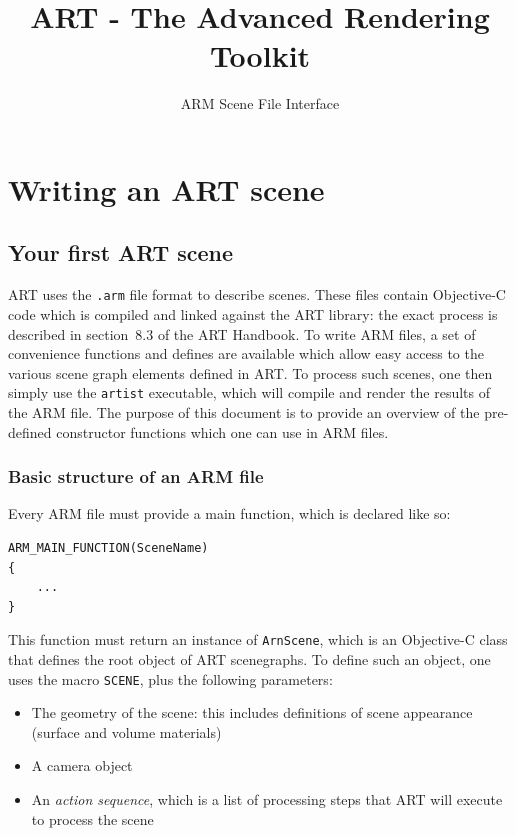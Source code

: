 \documentclass[a4paper,chapterprefix]{scrbook}
\title{
  \Huge ART - The Advanced Rendering Toolkit
}
\subtitle{ARM Scene File Interface}
\date{}
\begin{document}
\maketitle
\tableofcontents

\part{Writing an ART scene}

\chapter{Your first ART scene}

ART uses the \verb?.arm? file format to describe scenes. These files contain Objective-C code which is compiled and linked against the ART library: the exact process is described in section~8.3 of the ART Handbook. To write ARM files, a set of convenience functions and defines are available which allow easy access to the various scene graph elements defined in ART. To process such scenes, one then simply use the \verb?artist? executable, which will compile and render the results of the ARM file. The purpose of this document is to provide an overview of the pre-defined constructor functions which one can use in ARM files.

\section{Basic structure of an ARM file}
Every ARM file must provide a main function, which is declared like so:
\begin{lstlisting}
ARM_MAIN_FUNCTION(SceneName)
{
    ...
}
\end{lstlisting}

This function must return an instance of \verb?ArnScene?, which is an Objective-C class that defines the root object of ART scenegraphs. To define such an object, one uses the macro \verb?SCENE?, plus the following parameters:

\begin{itemize}
	\item The geometry of the scene: this includes definitions of scene appearance (surface and volume materials)
	\item A camera object
	\item An \emph{action sequence}, which is a list of processing steps that ART will execute to process the scene
\end{itemize}
\end{document}
